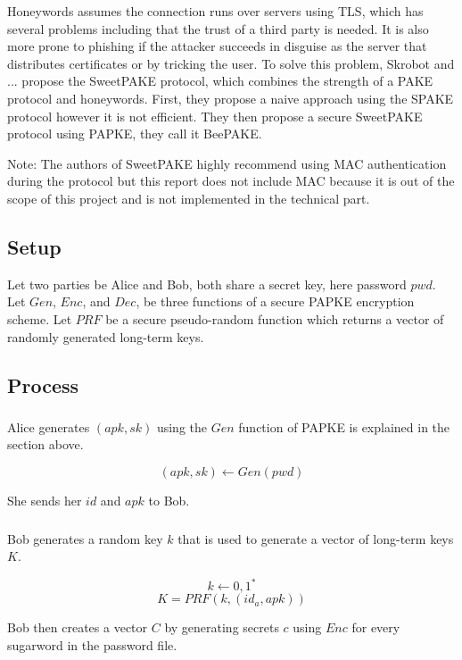 \documentclass[../main.tex]{subfiles}
\begin{document}
Honeywords assumes the connection runs over servers using TLS, which has several
problems including that the trust of a third party is needed. It is also more
prone to phishing if the attacker succeeds in disguise as the server that
distributes certificates or by tricking the user. To solve this problem,
Skrobot and ... \cite{marjan2023} propose the SweetPAKE protocol, which
combines the strength of a PAKE protocol and honeywords. First, they propose a
naive approach using the SPAKE protocol however it is not efficient. They then
propose a secure SweetPAKE protocol using PAPKE, they call it BeePAKE. 

Note: The authors of SweetPAKE highly recommend using MAC authentication during
the protocol but this report does not include MAC because it is out of the scope of
this project and is not implemented in the technical part.

\subsection{Setup} Let two parties be Alice and Bob, both share a secret key,
here password \(pwd\). Let \(Gen\),  \(Enc\), and \(Dec\), be three functions
of a secure PAPKE encryption scheme. Let \(PRF\) be a secure pseudo-random
function which returns a vector of randomly generated long-term keys.

\subsection{Process}
\subsubsection{} Alice generates \((apk, sk)\) using the \(Gen\) function of
PAPKE is explained in the section above.

\[(apk, sk) \leftarrow Gen(pwd)\]

She sends her \(id\) and \(apk\) to Bob.

\subsubsection{} Bob generates a random key \(k\) that is used to generate a 
vector of long-term keys \(K\).

\[k \leftarrow {0,1}^*\]
\[K = PRF(k, (id_a, apk))\]

Bob then creates a vector \(C\) by generating secrets \(c\) using \(Enc\) for 
every sugarword in the password file.
\end{document}
